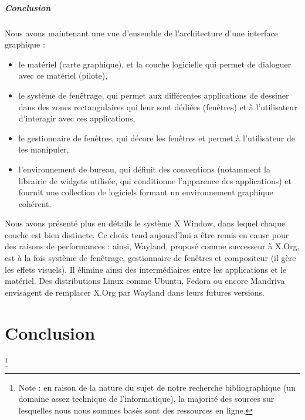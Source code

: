 \documentclass[a4paper,11pt]{report}
\begin{document}




\paragraph{Conclusion} Nous avons maintenant une vue d'ensemble de l'architecture d'une interface graphique :
\begin{itemize}
 \item le matériel (carte graphique), et la couche logicielle qui permet de dialoguer avec ce matériel (pilote),
 \item le système de fenêtrage, qui permet aux différentes applications de dessiner dans des zones rectangulaires qui leur sont dédiées (fenêtres) et à l'utilisateur d'interagir avec ces applications,
 \item le gestionnaire de fenêtres, qui décore les fenêtres et permet à l'utilisateur de les manipuler,
 \item l'environnement de bureau, qui définit des conventions (notamment la librairie de widgets utilisée, qui conditionne l'apparence des applications) et fournit une collection de logiciels formant un environnement graphique cohérent.
\end{itemize}

\vspace{1em}

Nous avons présenté plus en détails le système X Window, dans lequel chaque couche est bien distincte. Ce choix tend aujourd'hui a être remis en cause pour des raisons de performances : ainsi, Wayland, proposé comme successeur à X.Org, est à la fois système de fenêtrage, gestionnaire de fenêtres et compositeur (il gère les effets visuels). Il élimine ainsi des intermédiaires entre les applications et le matériel. Des distributions Linux comme Ubuntu, Fedora ou encore Mandriva envisagent de remplacer X.Org par Wayland dans leurs futures versions.

\chapter*{Conclusion}





\footnote[1]{Note : en raison de la nature du sujet de notre recherche bibliographique (un domaine assez technique de l'informatique), la majorité des sources sur lesquelles nous nous sommes basés sont des ressources en ligne.}
\end{document}
